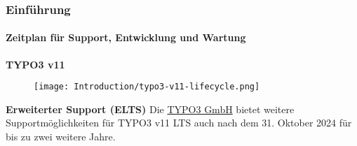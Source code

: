 %

\begin{frame}[fragile]
	\frametitle{Einführung}
	\framesubtitle{Zeitplan für Support, Entwicklung und Wartung}

	\textbf{TYPO3 v11}

	\begin{figure}
		\texttt{[image: Introduction/typo3-v11-lifecycle.png]}
	\end{figure}

	\textbf{Erweiterter Support (ELTS)}\newline
	\smaller
		Die \href{https://typo3.com}{TYPO3 GmbH} bietet weitere Supportmöglichkeiten 
		für TYPO3 v11 LTS auch nach dem 31. Oktober 2024 für bis zu zwei weitere
		Jahre.
	\normalsize

\end{frame}

